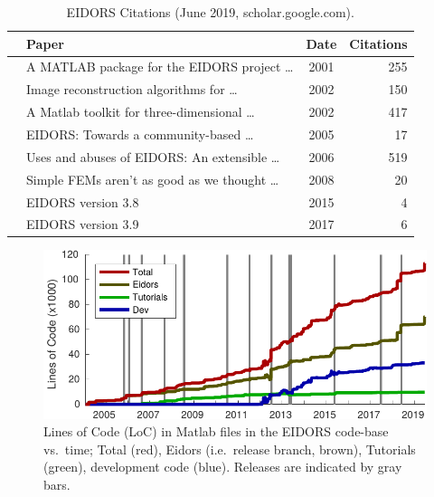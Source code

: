 \documentclass[10pt,letterpaper]{article}
\begin{document}
\begin{multicols}{2}
\begin{table}[H]
  \footnotesize
\centering
\caption{\label{tbl:cite} EIDORS Citations
 (June 2019, scholar.google.com).
}
\begin{tabular}{r@{\hspace{1mm}}lcr}
  \toprule
  & Paper & Date & \hspace{-2mm}Citations \\
  \midrule
  \cite{vauhkonen2001} & A MATLAB package for the EIDORS project \ldots\hspace{-5mm}  
    & 2001 & 255 \\
  \cite{polydorides2002phd} & Image reconstruction algorithms for \ldots
    & 2002 & 150 \\
  \cite{polydorides2002matlab} & A Matlab toolkit for three-dimensional \ldots
    & 2002 & 417 \\
  \cite{adler2005} & EIDORS: Towards a community-based \ldots
    & 2005 & 17 \\
  \cite{adler2006} & Uses and abuses of {EIDORS}: An extensible \ldots
    & 2006 & 519 \\
  \cite{adler2008} & Simple FEMs aren't as good as we thought \ldots
    & 2008 &  20 \\
  \cite{adler2015} & EIDORS version 3.8
    & 2015 & 4 \\
  \cite{adler2017} & EIDORS version 3.9
    & 2017 & 6 \\
  \bottomrule
\end{tabular}
\vspace{-1em}
\end{table}

\begin{figure}[H]
  \vspace{-2.5mm}
\centering
 \includegraphics[width=.96\columnwidth]{fig_loc.pdf}
\caption{\label{fig:loc}%
  Lines of Code (LoC) in Matlab files in the EIDORS code-base vs.\ time; Total
   (red), Eidors (i.e.\ release branch, brown), Tutorials (green), development code (blue).
   Releases are indicated by gray bars.
}
\end{figure}


\end{multicols}
\end{document}
